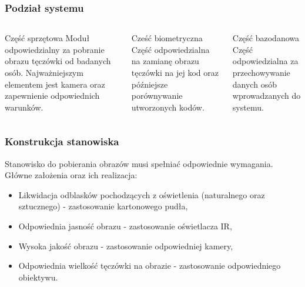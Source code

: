 \documentclass{beamer}
\begin{document}

\begin{frame}
\frametitle{Podział systemu}
\begin{columns}[t]
\begin{block}{Część sprzętowa}
\centering
Moduł odpowiedzialny za pobranie obrazu tęczówki od badanych osób. Najważniejszym elementem jest kamera oraz zapewnienie odpowiednich warunków.
\end{block}
\begin{block}{Cześć biometryczna}
\centering
Część odpowiedzialna na zamianę obrazu tęczówki na jej kod oraz późniejsze porównywanie utworzonych kodów.
\end{block}
\begin{block}{Część bazodanowa}
\centering
Część odpowiedzialna za przechowywanie danych osób wprowadzanych do systemu.
\end{block}
\end{columns} 

\end{frame}


\begin{frame}
\frametitle{Konstrukcja stanowiska}
Stanowisko do pobierania obrazów musi spełniać odpowiednie wymagania. Główne założenia oraz ich realizacja:
\begin{itemize}
\item Likwidacja odblasków pochodzących z oświetlenia (naturalnego oraz sztucznego) - zastosowanie kartonowego pudła,
\item Odpowiednia jasność obrazu - zastosowanie oświetlacza IR,
\item Wysoka jakość obrazu - zastosowanie odpowiedniej kamery,
\item Odpowiednia wielkość tęczówki na obrazie - zastosowanie odpowiedniego obiektywu.
\end{itemize}
\end{frame}
\end{document}
